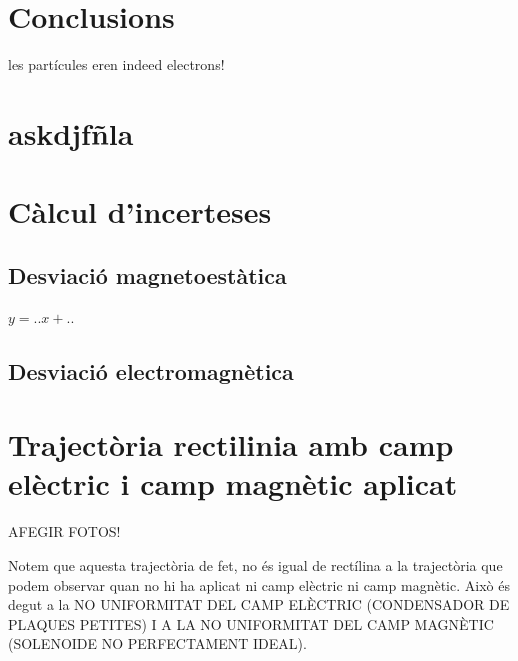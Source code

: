 \documentclass[11pt]{article}
\begin{document}
\section{Conclusions}
les partícules eren indeed electrons!

\section{askdjfñla}

\section{Càlcul d'incerteses}\label{sec: incerteses}
\subsection{Desviació magnetoestàtica\label{sec: inc_desv_mag}}
$y=..x+..$

\subsection{Desviació electromagnètica}\label{sec: inc_desv_em}

\section{Trajectòria rectilinia amb camp elèctric i camp magnètic aplicat}\label{sec: traj_no_rect}

AFEGIR FOTOS!

Notem que aquesta trajectòria de fet, no és igual de rectílina a la trajectòria que podem observar quan no hi ha aplicat ni camp elèctric ni camp magnètic. Això és degut a la NO UNIFORMITAT DEL CAMP ELÈCTRIC (CONDENSADOR DE PLAQUES PETITES) I A LA NO UNIFORMITAT DEL CAMP MAGNÈTIC (SOLENOIDE NO PERFECTAMENT IDEAL).
\end{document}
